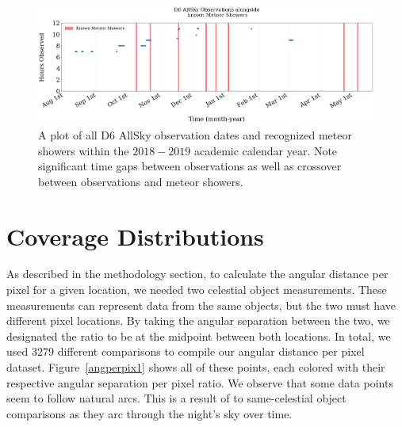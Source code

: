 \begin{figure}[ht!]
  \centering
  \includegraphics[scale=0.25]{images/nights_observed_with_meteorshowers.png}
  \caption[A plot of all D6 AllSky observation dates and recognized meteor showers within the $2018-2019$ academic calendar year.]{A plot of all D6 AllSky observation dates and recognized meteor showers within the $2018-2019$ academic calendar year.  Note significant time gaps between observations as well as crossover between observations and meteor showers.}
  \label{dateplot}
\end{figure}




\section{Coverage Distributions}

As described in the methodology section, to calculate the angular distance per pixel for a given location, we needed two celestial object measurements.
These measurements can represent data from the same objects, but the two must have different pixel locations.
By taking the angular separation between the two, we designated the ratio to be at the midpoint between both locations.  
In total, we used $3279$ different comparisons to compile our angular distance per pixel dataset.  
Figure~\ref{angperpix1} shows all of these points, each colored with their respective angular separation per pixel ratio. 
We observe that some data points seem to follow natural arcs.
This is a result of to same-celestial object comparisons as they arc through the night's sky over time.


